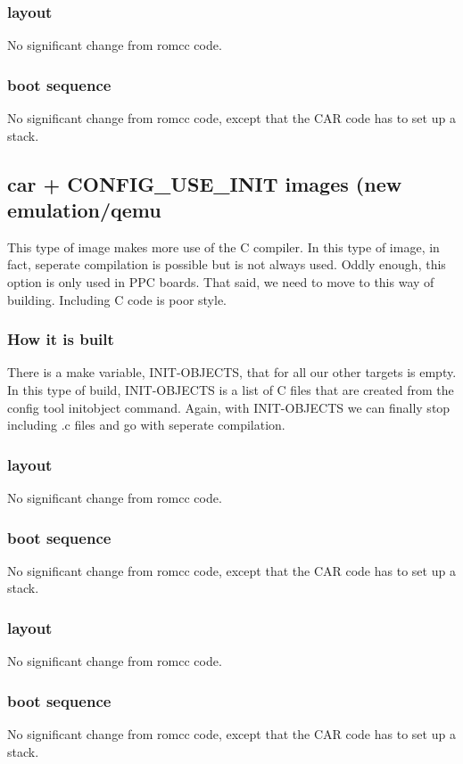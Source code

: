 \documentclass[titlepage,12pt]{article}
\begin{document}
\subsubsection{layout}
No significant change from romcc code.
\subsubsection{boot sequence}
No significant change from romcc code, except that the CAR code has to set up a stack.

\subsection{car + CONFIG\_USE\_INIT images (new emulation/qemu}
This type of image makes more use of the C compiler. In this type of image, in fact,
seperate compilation is possible but is not always used. Oddly enough, this option is only used in PPC boards. That said, we need to move to this way of building. Including C code is poor style.
\subsubsection{How it is built}
There is a make variable, INIT-OBJECTS, that for all our other targets is empty. In this type of build, INIT-OBJECTS is a list of C files that are created from the config tool initobject command. Again, with INIT-OBJECTS we can finally stop including .c files and go with seperate compilation.
\subsubsection{layout}
No significant change from romcc code.
\subsubsection{boot sequence}
No significant change from romcc code, except that the CAR code has to set up a stack.

\subsubsection{layout}
No significant change from romcc code.
\subsubsection{boot sequence}
No significant change from romcc code, except that the CAR code has to set up a stack.
\end{document}
